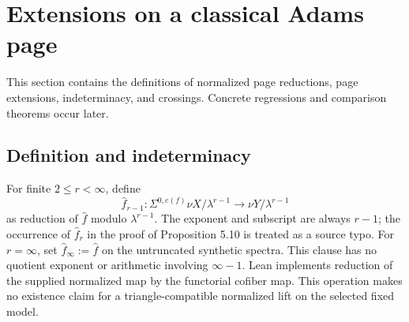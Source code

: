 \section{Extensions on a classical Adams page}
\label{chap:page-extensions}

This section contains the definitions of normalized page reductions, page extensions, indeterminacy, and crossings.  Concrete regressions and comparison theorems occur later.

\subsection{Definition and indeterminacy}

\begin{definition}
  \label{def:hat-map-page-reduction}
  \leanok
  For finite $2\le r<\infty$, define
  \[
    \widehat f_{r-1}:\Sigma^{0,e(f)}\nu X/\lambda^{r-1}
       \longrightarrow\nu Y/\lambda^{r-1}
  \]
  as reduction of $\widehat f$ modulo $\lambda^{r-1}$.  The exponent and
  subscript are always $r-1$; the occurrence of $\widehat f_r$ in the proof of
  Proposition 5.10 is treated as a source typo.
  For $r=\infty$, set $\widehat f_\infty:=\widehat f$ on the untruncated
  synthetic spectra.  This clause has no quotient exponent or arithmetic
  involving $\infty-1$.
  Lean implements reduction of the supplied normalized map by the
  functorial cofiber map.  This operation makes no existence claim for a
  triangle-compatible normalized lift on the selected fixed model.
\end{definition}


